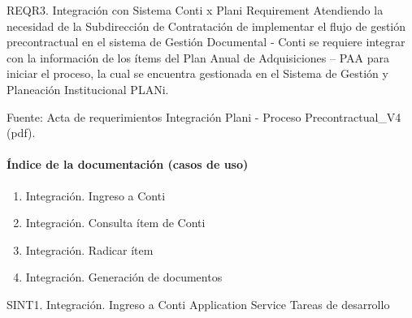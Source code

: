 \documentclass[
  paper=a4,
  ,captions=tableheading
]{scrartcl}
\providecommand{\tightlist}{%
  \setlength{\itemsep}{0pt}\setlength{\parskip}{0pt}}
\begin{document}
\textbar{} \textbar{} REQR3. Integración con Sistema Conti x Plani
\textbar{} Requirement \textbar{} Atendiendo la necesidad de la
Subdirección de Contratación de implementar el flujo de gestión
precontractual en el sistema de Gestión Documental - Conti se requiere
integrar con la información de los ítems del Plan Anual de Adquisiciones
-- PAA para iniciar el proceso, la cual se encuentra gestionada en el
Sistema de Gestión y Planeación Institucional PLANi.

Fuente: Acta de requerimientos Integración Plani - Proceso
Precontractual\_V4 (pdf).

\paragraph{Índice de la documentación (casos de
uso)}\label{sec:uxedndice-de-la-documentaciuxf3n-casos-de-uso-4}

\begin{enumerate}
\def\labelenumi{\arabic{enumi}.}
\tightlist
\item
  Integración. Ingreso a Conti
\item
  Integración. Consulta ítem de Conti
\item
  Integración. Radicar ítem
\item
  Integración. Generación de documentos
\end{enumerate}

\textbar{} \textbar{} SINT1. Integración. Ingreso a Conti \textbar{}
Application Service \textbar{} Tareas de desarrollo
\end{document}
